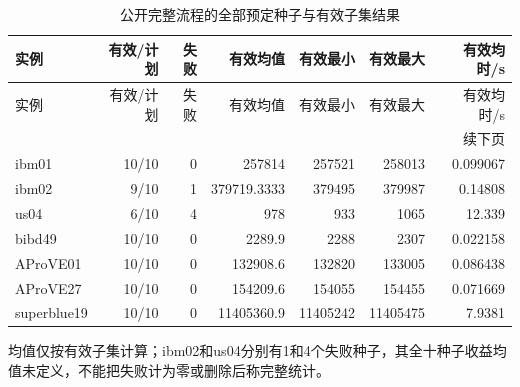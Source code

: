 {\small\setlength{\tabcolsep}{4pt}
\begin{longtable}{lrrrrrr}
\caption{公开完整流程的全部预定种子与有效子集结果}\label{tab:author_results}\\
\toprule
实例 & 有效/计划 & 失败 & 有效均值 & 有效最小 & 有效最大 & 有效均时/s\\
\midrule
\endfirsthead
\toprule
实例 & 有效/计划 & 失败 & 有效均值 & 有效最小 & 有效最大 & 有效均时/s\\
\midrule
\endhead
\midrule
\multicolumn{7}{r}{续下页}\\
\endfoot
\bottomrule
\endlastfoot
ibm01 & 10/10 & 0 & 257814 & 257521 & 258013 & 0.099067\\
ibm02 & 9/10 & 1 & 379719.3333 & 379495 & 379987 & 0.14808\\
us04 & 6/10 & 4 & 978 & 933 & 1065 & 12.339\\
bibd49 & 10/10 & 0 & 2289.9 & 2288 & 2307 & 0.022158\\
AProVE01 & 10/10 & 0 & 132908.6 & 132820 & 133005 & 0.086438\\
AProVE27 & 10/10 & 0 & 154209.6 & 154055 & 154455 & 0.071669\\
superblue19 & 10/10 & 0 & 11405360.9 & 11405242 & 11405475 & 7.9381\\
\end{longtable}
}
均值仅按有效子集计算；ibm02和us04分别有1和4个失败种子，其全十种子收益均值未定义，不能把失败计为零或删除后称完整统计。
